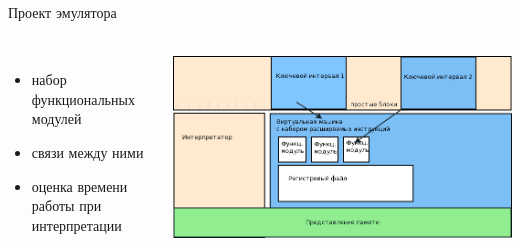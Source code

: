 \documentclass{beamer}              %
\begin{document}
\begin{frame}{Проект эмулятора}
  \framesubtitle{}
   
  \begin{columns}
      \begin{itemize}
        \item набор функциональных модулей
        \item связи между ними
        \item оценка времени работы при интерпретации
      \end{itemize}

      \includegraphics[width=1.0\textwidth]{img/Emulator.png}
  \end{columns}		  
\end{frame}
\end{document}
